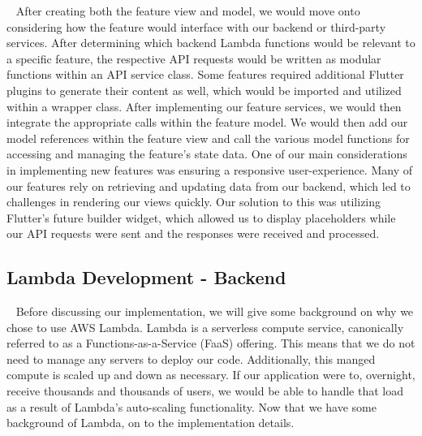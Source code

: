 \documentclass[10pt, a4paper]{article}
\begin{document}
\par ~ After creating both the feature view and model, we would move onto considering how the feature would interface with our backend or third-party services. After determining which backend Lambda functions would be relevant to a specific feature, the respective API requests would be written as modular functions within an API service class. Some features required additional Flutter plugins to generate their content as well, which would be imported and utilized within a wrapper class. After implementing our feature services, we would then integrate the appropriate calls within the feature model. We would then add our model references within the feature view and call the various model functions for accessing and managing the feature's state data. One of our main considerations in implementing new features was ensuring a responsive user-experience. Many of our features rely on retrieving and updating data from our backend, which led to challenges in rendering our views quickly. Our solution to this was utilizing Flutter's future builder widget, which allowed us to display placeholders while our API requests were sent and the responses were received and processed.


\subsection{Lambda Development - Backend}
\par ~ Before discussing our implementation, we will give some background on why we chose to use AWS Lambda. Lambda is a serverless compute service, canonically referred to as a Functions-as-a-Service (FaaS) offering. This means that we do not need to manage any servers to deploy our code. Additionally, this manged compute is scaled up and down as necessary. If our application were to, overnight, receive thousands and thousands of users, we would be able to handle that load as a result of Lambda's auto-scaling functionality. Now that we have some background of Lambda, on to the implementation details.
\end{document}

